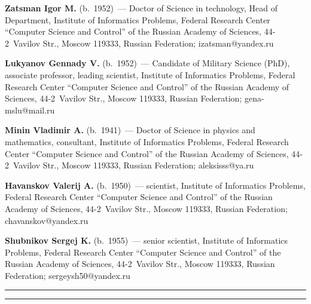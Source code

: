 
\Contr

\noindent
\textbf{Zatsman Igor M.} (b.\ 1952)~--- 
Doctor of Science in technology, Head of Department, Institute of Informatics 
Problems, Federal Research Center ``Computer Science and Control'' 
of the Russian Academy of Sciences, 44-2~Vavilov Str., Moscow 119333, 
Russian Federation; \mbox{izatsman@yandex.ru}  

\vspace*{3pt}

\noindent
\textbf{Lukyanov Gennady V.} (b.\ 1952)~--- 
Candidate of Military Science (PhD), associate professor, leading scientist, 
Institute of Informatics Problems, Federal Research Center ``Computer Science and 
Control'' of the Russian Academy of Sciences, 44-2~Vavilov Str., Moscow 119333, Russian Federation; 
\mbox{gena-mslu@mail.ru} 

\vspace*{3pt}

\noindent
\textbf{Minin Vladimir A.} (b.\ 1941)~--- 
Doctor of Science in physics and mathematics, consultant, Institute of Informatics 
Problems, Federal Research Center ``Computer Science and Control'' of 
the Russian Academy of Sciences, 44-2~Vavilov Str., Moscow 119333, Russian Federation; 
\mbox{aleksisss@ya.ru}  

\vspace*{3pt}

\noindent
\textbf{Havanskov Valerij A.} (b.\ 1950)~--- 
scientist, Institute of Informatics Problems, Federal Research Center
``Computer Science and Control'' of the Russian Academy of Sciences, 
44-2~Vavilov Str., Moscow 119333, Russian Federation; \mbox{chavanskov@yandex.ru} 

\vspace*{3pt}

\noindent
\textbf{Shubnikov Sergej K.} (b.\ 1955)~--- 
senior scientist, Institute of Informatics Problems, Federal Research Center 
``Computer Science and Control'' of the Russian Academy of Sciences, 
44-2~Vavilov Str., Moscow 119333, Russian Federation; \mbox{sergeysh50@yandex.ru}


\vspace*{12pt}

\hrule

\vspace*{2pt}

\hrule


